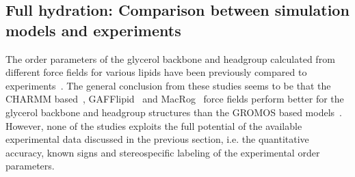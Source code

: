 \documentclass[journal=jpcbfk,manuscript=article]{achemso}
\begin{document}
\subsection{Full hydration: Comparison between simulation models and experiments}

The order parameters of the glycerol backbone and headgroup calculated from different force fields for various lipids have been 
previously compared to experiments~\cite{shinoda97,hogberg08,castro08,klauda10,kapla12,dickson12,poger12,ferreira13,chowdhary13,maciejewski14}. 
The general conclusion from these studies seems to be that the CHARMM based~\cite{hogberg08,klauda10}, GAFFlipid~\cite{dickson12} and
MacRog~\cite{maciejewski14} force fields perform better for the glycerol backbone and headgroup structures than the GROMOS based models~\cite{castro08,kapla12,poger12,ferreira13}.
However, none of the studies exploits the full potential of the available experimental data discussed in the previous section, i.e. the quantitative accuracy, known signs and stereospecific labeling of
the experimental order parameters.
\end{document}
